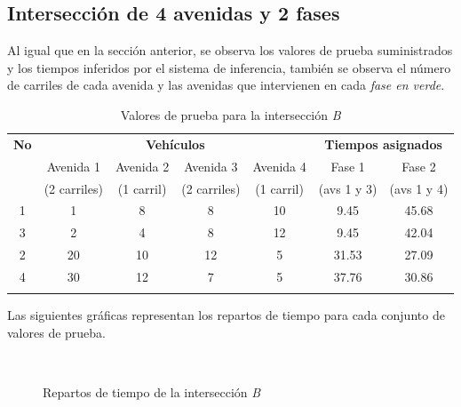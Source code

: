 \subsection{Intersección de 4 avenidas y 2 fases}
Al igual que en la sección anterior, se observa los valores de prueba suministrados y los tiempos inferidos por el sistema de inferencia, también se observa el número de carriles de cada avenida y las avenidas que intervienen en cada \emph{fase en verde}.\\
\begin{longtable}[c]{ccccccc} \toprule
	\textbf{No} &\multicolumn{4}{c}{\textbf{Vehículos}} & \multicolumn{2}{c}{\textbf{Tiempos asignados}} \\[0.2cm]
	&  Avenida 1 & Avenida 2 &  Avenida 3 & Avenida 4 & Fase 1 & Fase 2 \\[0cm]
	&{\scriptsize(2 carriles)}&{\scriptsize (1 carril)} &{\scriptsize (2 carriles)} & {\scriptsize (1 carril)} &{\scriptsize (avs 1 y 3)} &{\scriptsize(avs 1 y 4)} \\[0.1cm]\midrule
	1 & 1 & 8 & 8 & 10 & 9.45 &45.68\\
	3 & 2 & 4 & 8 & 12 & 9.45 & 42.04\\
	2 & 20 & 10 & 12 & 5 & 31.53 & 27.09\\
	4 & 30 & 12 & 7 & 5 & 37.76& 30.86 \\\bottomrule
	\caption{Valores de prueba para la intersección \textit{B}}
\end{longtable}
\vspace{5\parskip}
Las siguientes gráficas representan los repartos de tiempo para cada conjunto de valores de prueba.
\begin{figure}[H]
	\centering
	\\
	\caption{Repartos de tiempo de la intersección \textit{B}}
\end{figure}




